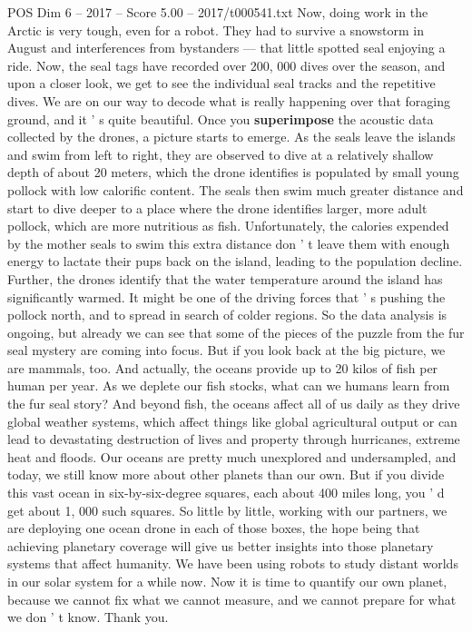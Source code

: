 \begin{textsample}{POS Dim 6 – 2017 – Score 5.00 – 2017/t000541.txt}
Now, doing work in the Arctic is very tough, even for a robot.
They had to survive a snowstorm in August and interferences from bystanders — that little spotted seal enjoying a ride.
Now, the seal tags have recorded over 200, 000 dives over the season, and upon a closer look, we get to see the individual seal tracks and the repetitive dives.
We are on our way to decode what is really happening over that foraging ground, and it ' s quite beautiful.
Once you \textbf{superimpose} the acoustic data collected by the drones, a picture starts to emerge.
As the seals leave the islands and swim from left to right, they are observed to dive at a relatively shallow depth of about 20 meters, which the drone identifies is populated by small young pollock with low calorific content.
The seals then swim much greater distance and start to dive deeper to a place where the drone identifies larger, more adult pollock, which are more nutritious as fish.
Unfortunately, the calories expended by the mother seals to swim this extra distance don ' t leave them with enough energy to lactate their pups back on the island, leading to the population decline.
Further, the drones identify that the water temperature around the island has significantly warmed.
It might be one of the driving forces that ' s pushing the pollock north, and to spread in search of colder regions.
So the data analysis is ongoing, but already we can see that some of the pieces of the puzzle from the fur seal mystery are coming into focus.
But if you look back at the big picture, we are mammals, too.
And actually, the oceans provide up to 20 kilos of fish per human per year.
As we deplete our fish stocks, what can we humans learn from the fur seal story?
And beyond fish, the oceans affect all of us daily as they drive global weather systems, which affect things like global agricultural output or can lead to devastating destruction of lives and property through hurricanes, extreme heat and floods.
Our oceans are pretty much unexplored and undersampled, and today, we still know more about other planets than our own.
But if you divide this vast ocean in six-by-six-degree squares, each about 400 miles long, you ' d get about 1, 000 such squares.
So little by little, working with our partners, we are deploying one ocean drone in each of those boxes, the hope being that achieving planetary coverage will give us better insights into those planetary systems that affect humanity.
We have been using robots to study distant worlds in our solar system for a while now.
Now it is time to quantify our own planet, because we cannot fix what we cannot measure, and we cannot prepare for what we don ' t know.
Thank you.

\end{textsample}
